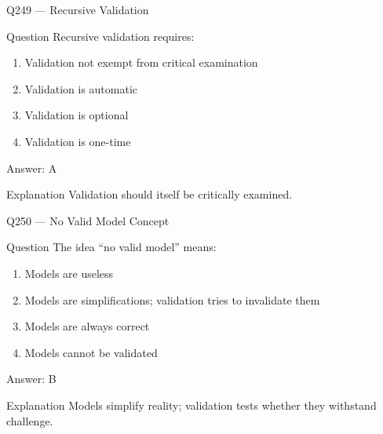 \documentclass[aspectratio=169,8pt]{beamer}
\begin{document}
								\begin{frame}{Q249 --- Recursive Validation}
									\begin{block}{Question}
										Recursive validation requires:
										\begin{enumerate}
											\item Validation not exempt from critical examination
											\item Validation is automatic
											\item Validation is optional
											\item Validation is one-time
										\end{enumerate}
									\end{block}
									\begin{exampleblock}{Answer: A}\end{exampleblock}
									\begin{block}{Explanation}
										Validation should itself be critically examined.
									\end{block}
								\end{frame}
								
								\begin{frame}{Q250 --- No Valid Model Concept}
									\begin{block}{Question}
										The idea ``no valid model'' means:
										\begin{enumerate}
											\item Models are useless
											\item Models are simplifications; validation tries to invalidate them
											\item Models are always correct
											\item Models cannot be validated
										\end{enumerate}
									\end{block}
									\begin{exampleblock}{Answer: B}\end{exampleblock}
									\begin{block}{Explanation}
										Models simplify reality; validation tests whether they withstand challenge.
									\end{block}
								\end{frame}
								
\end{document}
